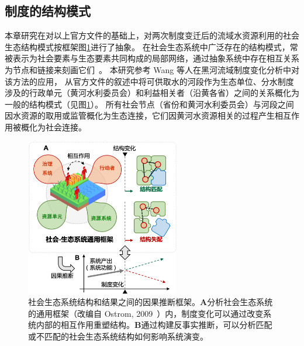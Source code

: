 \subsection{制度的结构模式}\label{sec:structures}

本章研究在对以上官方文件的基础上，对两次制度变迁后的流域水资源利用的社会\textendash{}生态结构模式按框架图\ref{fig:framework}进行了抽象。
在社会\textendash{}生态系统中广泛存在的结构模式，常被表示为社会要素与生态要素共同构成的局部网络，通过抽象系统中存在相互关系为节点和链接来刻画它们~\cite{bodin2017,kluger2020,guerrero2015}。
本研究参考 Wang 等人在黑河流域制度变化分析中对该方法的应用\cite{wang2019b}，
从官方文件的叙述中将可供取水的河段作为生态单位、分水制度涉及的行政单元（黄河水利委员会）和利益相关者（沿黄各省）之间的关系概化为一般的结构模式（见图\ref{fig:framework}）。
所有社会节点（省份和黄河水利委员会）与河段之间因水资源的取用或监管概化为生态连接，它们因黄河水资源相关的过程产生相互作用被概化为社会连接。

\begin{figure}[!ht] %
    \centering
    \includegraphics[width=0.6\textwidth]{img/ch5/ch5_framework.png}
    \caption[社会\textendash{}生态系统结构和结果之间的因果推断框架]{社会\textendash{}生态系统结构和结果之间的因果推断框架。\textbf{A}分析社会\textendash{}生态系统的通用框架（改编自 Ostrom, 2009~\cite{ostrom2009}）内，制度变化可以通过改变系统内部的相互作用重塑结构。\textbf{B}通过构建反事实推断，可以分析匹配或不匹配的社会\textendash{}生态系统结构如何影响系统演变。}\label{fig:framework}
\end{figure}

